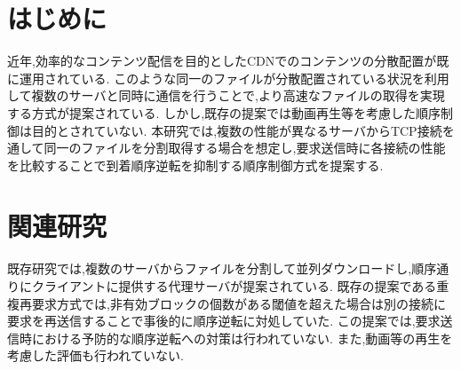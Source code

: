 \documentclass{ltjsarticle}
\begin{document}
 
\fontsize{9.6pt}{0pt}\selectfont
\section{はじめに}
\vspace{-2.75mm}
近年,効率的なコンテンツ配信を目的としたCDNでのコンテンツの分散配置が既に運用されている.
このような同一のファイルが分散配置されている状況を利用して複数のサーバと同時に通信を行うことで,より高速なファイルの取得を実現する方式が提案されている\cite{mhttp}\cite{proxy}.
しかし,既存の提案では動画再生等を考慮した順序制御は目的とされていない.
本研究では,複数の性能が異なるサーバからTCP接続を通して同一のファイルを分割取得する場合を想定し,要求送信時に各接続の性能を比較することで到着順序逆転を抑制する順序制御方式を提案する.
\vspace{-7.75mm}

\section{関連研究}
\vspace{-2.75mm}
既存研究では,複数のサーバからファイルを分割して並列ダウンロードし,順序通りにクライアントに提供する代理サーバが提案されている\cite{proxy}.
既存の提案である重複再要求方式では,非有効ブロックの個数がある閾値を超えた場合は別の接続に要求を再送信することで事後的に順序逆転に対処していた.
この提案では,要求送信時における予防的な順序逆転への対策は行われていない.
また,動画等の再生を考慮した評価も行われていない.
\vspace{-7.75mm}
\end{document}
